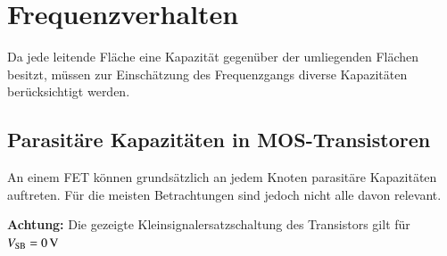 \section{Frequenzverhalten}

Da jede leitende Fläche eine Kapazität gegenüber der umliegenden Flächen besitzt, müssen zur Einschätzung des Frequenzgangs diverse Kapazitäten berücksichtigt werden.


\subsection{Parasitäre Kapazitäten in MOS-Transistoren}

An einem FET können grundsätzlich an jedem Knoten parasitäre Kapazitäten auftreten.
Für die meisten Betrachtungen sind jedoch nicht alle davon relevant. 

\smallskip

\textbf{Achtung:} Die gezeigte Kleinsignalersatzschaltung des Transistors gilt für $V_{\rm SB} = \qty{0}{\volt}$


